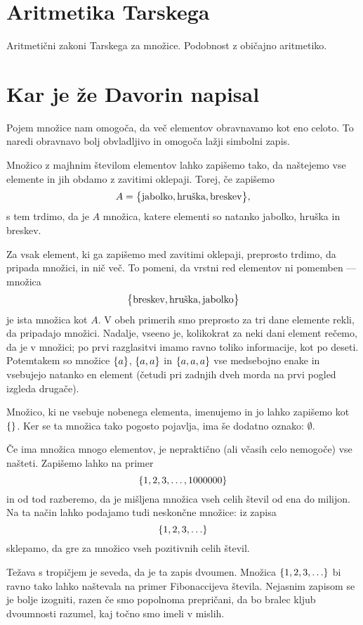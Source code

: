\section{Aritmetika Tarskega}
\label{sec:aritmetika-tarskega}

Aritmetični zakoni Tarskega za množice. Podobnost z običajno aritmetiko.


\section{Kar je že Davorin napisal}

Pojem množice nam omogoča, da več elementov obravnavamo kot eno celoto. To naredi obravnavo bolj obvladljivo in omogoča lažji simbolni zapis.

Množico z majhnim številom elementov lahko zapišemo tako, da naštejemo vse elemente in jih obdamo z zavitimi oklepaji. Torej, če zapišemo
\[A = \set[1]{\text{jabolko}, \text{hruška}, \text{breskev}},\]
s tem trdimo, da je $A$ množica, katere elementi so natanko jabolko, hruška in breskev.

Za vsak element, ki ga zapišemo med zavitimi oklepaji, preprosto trdimo, da pripada množici, in nič več. To pomeni, da vrstni red elementov ni pomemben --- množica
\[\set[1]{\text{breskev}, \text{hruška}, \text{jabolko}}\]
je ista množica kot $A$. V obeh primerih smo preprosto za tri dane elemente rekli, da pripadajo množici. Nadalje, vseeno je, kolikokrat za neki dani element rečemo, da je v množici; po prvi razglasitvi imamo ravno toliko informacije, kot po deseti. Potemtakem so množice $\set{a}$, $\set{a, a}$ in $\set{a, a, a}$ vse medsebojno enake in vsebujejo natanko en element (četudi pri zadnjih dveh morda na prvi pogled izgleda drugače).

Množico, ki ne vsebuje nobenega elementa, imenujemo  in jo lahko zapišemo kot $\set{}$. Ker se ta množica tako pogosto pojavlja, ima še dodatno oznako: $\emptyset$.

Če ima množica mnogo elementov, je nepraktično (ali včasih celo nemogoče) vse našteti. Zapišemo lahko na primer
\[\set{1, 2, 3, \ldots, 1000000}\]
in od tod razberemo, da je mišljena množica vseh celih števil od ena do milijon. Na ta način lahko podajamo tudi neskončne množice: iz zapisa
\[\set{1, 2, 3, \ldots}\]
sklepamo, da gre za množico vseh pozitivnih celih števil.

Težava s tropičjem je seveda, da je ta zapis dvoumen. Množica $\set{1, 2, 3, \ldots}$ bi ravno tako lahko naštevala na primer Fibonaccijeva števila. Nejasnim zapisom se je bolje izogniti, razen če smo popolnoma prepričani, da bo bralec kljub dvoumnosti razumel, kaj točno smo imeli v mislih.

